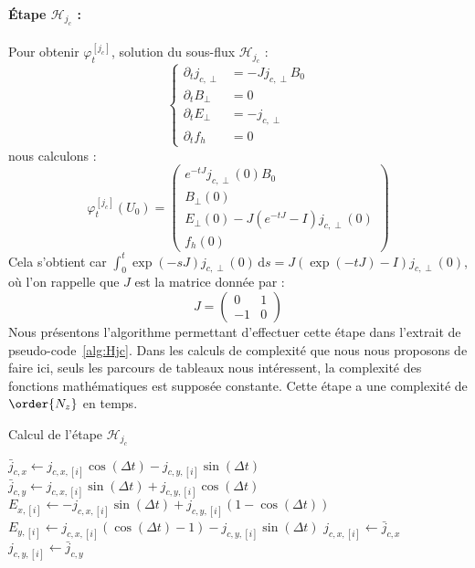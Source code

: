 \paragraph{Étape $\mathcal{H}_{j_c}$ :}
Pour obtenir $\varphi_t^{[j_c]}$, solution du sous-flux $\mathcal{H}_{j_c}$ :
$$
  \begin{cases}
    \partial_t j_{c,\perp} &= -Jj_{c,\perp}B_0 \\
    \partial_t B_\perp     &= 0 \\
    \partial_t E_\perp     &= -j_{c,\perp} \\
    \partial_t f_h         &= 0
  \end{cases}
$$
nous calculons :
$$
  \varphi_t^{[j_c]}(U_0) = \begin{pmatrix}
    e^{-tJ}j_{c,\perp}(0)B_0 \\
    B_\perp(0) \\
    E_\perp(0) - J\left(e^{-tJ}-I\right)j_{c,\perp}(0) \\
    f_h(0)
  \end{pmatrix}
$$
Cela s'obtient car $\int_0^t \exp(-sJ)j_{c,\perp}(0)\,\mathrm{d}s = J\left(\exp(-tJ)-I\right)j_{c,\perp}(0)$, où l'on rappelle que $J$ est la matrice donnée par :
$$
  J = \begin{pmatrix}
     0 & 1 \\
    -1 & 0
  \end{pmatrix}
$$
Nous présentons l'algorithme permettant d'effectuer cette étape dans l'extrait de pseudo-code~\ref{alg:Hjc}. Dans les calculs de complexité que nous nous proposons de faire ici, seuls les parcours de tableaux nous intéressent, la complexité des fonctions mathématiques est supposée constante. Cette étape a une complexité de $\order{N_z}$ en temps.
\begin{algorithm}
  \caption{Calcul de l'étape $\mathcal{H}_{j_c}$}
  \label{alg:Hjc}
  \begin{algorithmic}[1]
        \State $\bar{j}_{c,x} \gets j_{c,x,[i]}\cos(\Delta t) - j_{c,y,[i]}\sin(\Delta t) $
        \State $\bar{j}_{c,y} \gets j_{c,x,[i]}\sin(\Delta t) + j_{c,y,[i]}\cos(\Delta t) $
        \State $E_{x,[i]}\gets -j_{c,x,[i]}\sin(\Delta t)     + j_{c,y,[i]}(1-\cos(\Delta t))$
        \State $E_{y,[i]}\gets  j_{c,x,[i]}(\cos(\Delta t)-1) - j_{c,y,[i]}\sin(\Delta t)$
        \State $j_{c,x,[i]} \gets \bar{j}_{c,x}$
        \State $j_{c,y,[i]} \gets \bar{j}_{c,y}$
      \EndFor
    \EndFunction
  \end{algorithmic}
\end{algorithm}


